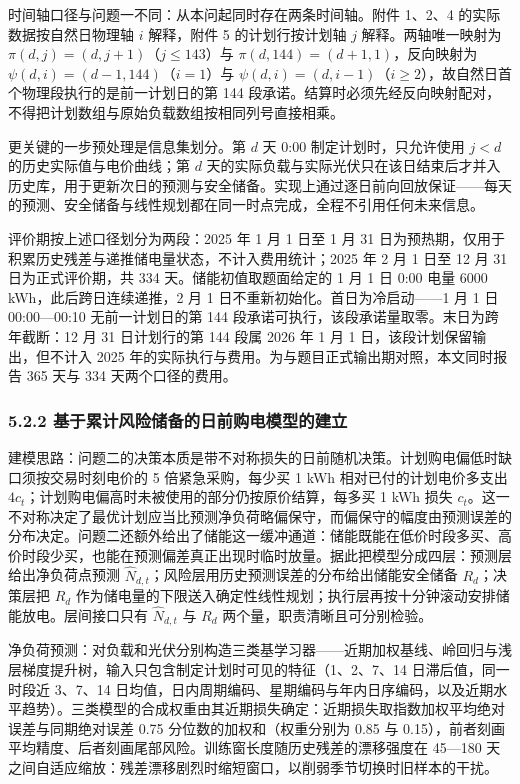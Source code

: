 \documentclass[12pt,a4paper]{ctexart}
\begin{document}
时间轴口径与问题一不同：从本问起同时存在两条时间轴。附件 1、2、4 的实际数据按自然日物理轴 $i$ 解释，附件 5 的计划行按计划轴 $j$ 解释。两轴唯一映射为 $\pi(d,j)=(d,j+1)$（$j\le143$）与 $\pi(d,144)=(d+1,1)$，反向映射为 $\psi(d,i)=(d-1,144)$（$i=1$）与 $\psi(d,i)=(d,i-1)$（$i\ge2$），故自然日首个物理段执行的是前一计划日的第 144 段承诺。结算时必须先经反向映射配对，不得把计划数组与原始负载数组按相同列号直接相乘。

更关键的一步预处理是信息集划分。第 $d$ 天 0:00 制定计划时，只允许使用 $j<d$ 的历史实际值与电价曲线；第 $d$ 天的实际负载与实际光伏只在该日结束后才并入历史库，用于更新次日的预测与安全储备。实现上通过逐日前向回放保证——每天的预测、安全储备与线性规划都在同一时点完成，全程不引用任何未来信息。

评价期按上述口径划分为两段：2025 年 1 月 1 日至 1 月 31 日为预热期，仅用于积累历史残差与递推储电量状态，不计入费用统计；2025 年 2 月 1 日至 12 月 31 日为正式评价期，共 334 天。储能初值取题面给定的 1 月 1 日 0:00 电量 6000 kWh，此后跨日连续递推，2 月 1 日不重新初始化。首日为冷启动——1 月 1 日 00:00—00:10 无前一计划日的第 144 段承诺可执行，该段承诺量取零。末日为跨年截断：12 月 31 日计划行的第 144 段属 2026 年 1 月 1 日，该段计划保留输出，但不计入 2025 年的实际执行与费用。为与题目正式输出期对照，本文同时报告 365 天与 334 天两个口径的费用。

\subsubsection*{5.2.2 基于累计风险储备的日前购电模型的建立}

建模思路：问题二的决策本质是带不对称损失的日前随机决策。计划购电偏低时缺口须按交易时刻电价的 5 倍紧急采购，每少买 1 kWh 相对已付的计划电价多支出 $4c_t$；计划购电偏高时未被使用的部分仍按原价结算，每多买 1 kWh 损失 $c_t$。这一不对称决定了最优计划应当比预测净负荷略偏保守，而偏保守的幅度由预测误差的分布决定。问题二还额外给出了储能这一缓冲通道：储能既能在低价时段多买、高价时段少买，也能在预测偏差真正出现时临时放量。据此把模型分成四层：预测层给出净负荷点预测 $\widehat{N}_{d,t}$；风险层用历史预测误差的分布给出储能安全储备 $R_d$；决策层把 $R_d$ 作为储电量的下限送入确定性线性规划；执行层再按十分钟滚动安排储能放电。层间接口只有 $\widehat{N}_{d,t}$ 与 $R_d$ 两个量，职责清晰且可分别检验。

净负荷预测：对负载和光伏分别构造三类基学习器——近期加权基线、岭回归与浅层梯度提升树，输入只包含制定计划时可见的特征（1、2、7、14 日滞后值，同一时段近 3、7、14 日均值，日内周期编码、星期编码与年内日序编码，以及近期水平趋势）。三类模型的合成权重由其近期损失确定：近期损失取指数加权平均绝对误差与同期绝对误差 0.75 分位数的加权和（权重分别为 0.85 与 0.15），前者刻画平均精度、后者刻画尾部风险。训练窗长度随历史残差的漂移强度在 45—180 天之间自适应缩放：残差漂移剧烈时缩短窗口，以削弱季节切换时旧样本的干扰。
\end{document}
